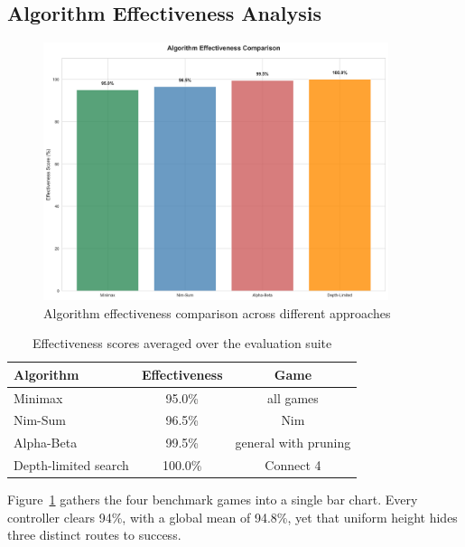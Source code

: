 \documentclass[12pt]{article}
\begin{document}
\subsection{Algorithm Effectiveness Analysis}

\begin{figure}[H]
    \centering
    \includegraphics[width=0.9\textwidth]{output/images/algorithm_effectiveness.png}
    \caption{Algorithm effectiveness comparison across different approaches}
    \label{fig:algorithm_effectiveness}
\end{figure}

\begin{table}[H]
    \centering
    \begin{tabular}{lcc}
        \toprule
        \textbf{Algorithm} & \textbf{Effectiveness} & \textbf{Game} \\
        \midrule
        Minimax & 95.0\% & all games \\
        Nim-Sum & 96.5\% & Nim \\
        Alpha-Beta & 99.5\% & general with pruning \\
        Depth-limited search & 100.0\% & Connect 4 \\
        \bottomrule
    \end{tabular}
    \caption{Effectiveness scores averaged over the evaluation suite}
    \label{tab:algorithm_effectiveness}
\end{table}

Figure~\ref{fig:algorithm_effectiveness} gathers the four benchmark games into a single bar chart. Every controller clears 94\%, with a global mean of 94.8\%, yet that uniform height hides three distinct routes to success.
\end{document}
